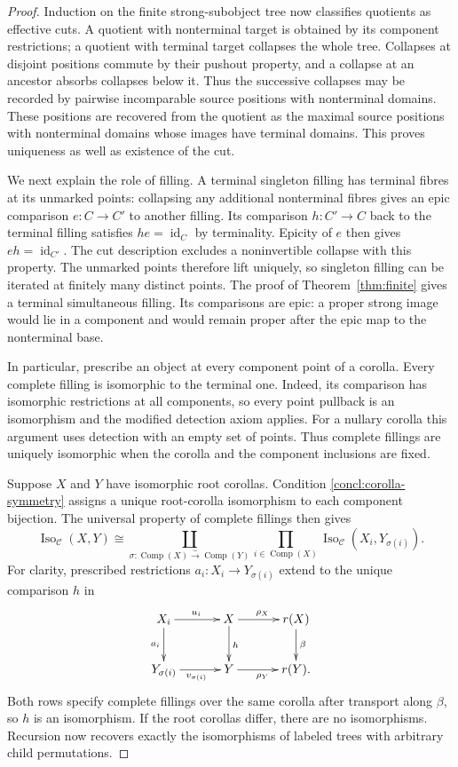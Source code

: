 \documentclass[10pt,a4paper]{amsart}
\newcommand{\C}{\mathcal C}
\newcommand{\Comp}{\operatorname{Comp}}
\newcommand{\id}{\operatorname{id}}
\begin{document}
\begin{proof}
Induction on the finite strong-subobject tree now classifies
quotients as effective cuts. A quotient with nonterminal target
is obtained by its component restrictions; a quotient with
terminal target collapses the whole tree. Collapses at disjoint
positions commute by their pushout property, and a collapse at
an ancestor absorbs collapses below it. Thus the successive
collapses may be recorded by pairwise incomparable source
positions with nonterminal domains. These positions are
recovered from the quotient as the maximal source positions
with nonterminal domains whose images have terminal domains.
This proves uniqueness as well as existence of the cut.

We next explain the role of filling. A terminal singleton filling
has terminal fibres at its unmarked points: collapsing any additional
nonterminal fibres gives an epic comparison $e:C\to C'$ to
another filling. Its comparison $h:C'\to C$ back to the
terminal filling satisfies $he=\id_C$ by terminality.
Epicity of $e$ then gives $eh=\id_{C'}$. The cut description
excludes a noninvertible collapse with this property. The unmarked
points therefore lift uniquely, so singleton filling can be iterated
at finitely many distinct points. The proof of
Theorem~\ref{thm:finite} gives a terminal simultaneous filling.
Its comparisons are epic: a proper strong image would lie in a
component and would remain proper after the epic map to the
nonterminal base.

In particular, prescribe an object at every component point of a
corolla. Every complete filling is isomorphic to the terminal one.
Indeed, its comparison has isomorphic restrictions at all components,
so every point pullback is an isomorphism and the modified detection
axiom applies. For a nullary corolla this argument uses detection
with an empty set of points. Thus complete fillings are uniquely
isomorphic when the corolla and the component inclusions are fixed.

Suppose $X$ and $Y$ have isomorphic root corollas. Condition
\eqref{concl:corolla-symmetry} assigns a unique root-corolla
isomorphism to each component bijection. The universal property of
complete fillings then gives
\begin{equation}\label{concl:recursive-isomorphisms}
 \operatorname{Iso}_{\C}(X,Y)\cong
 \coprod_{\sigma:\Comp(X)\xrightarrow{\sim}\Comp(Y)}
 \prod_{i\in\Comp(X)}\operatorname{Iso}_{\C}(X_i,Y_{\sigma(i)}).
\end{equation}
For clarity, prescribed restrictions $a_i:X_i\to Y_{\sigma(i)}$
extend to the unique comparison $h$ in
\[
\xymatrix@C=3.2em@R=2.4em{
X_i\ar[r]^{u_i}\ar[d]_{a_i}&X\ar[r]^{\rho_X}\ar[d]^h
 &r(X)\ar[d]^\beta\\
Y_{\sigma(i)}\ar[r]_{v_{\sigma(i)}}&Y\ar[r]_{\rho_Y}&r(Y).
}
\]
Both rows specify complete fillings over the same corolla after
transport along $\beta$, so $h$ is an isomorphism. If the root
corollas differ, there are no isomorphisms. Recursion now recovers
exactly the isomorphisms of labeled trees with arbitrary child
permutations.


\end{proof}
\end{document}
